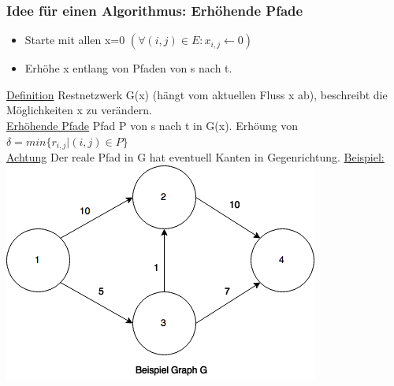 \documentclass[a4paper]{article}
\begin{document}
\subsubsection*{Idee für einen Algorithmus: Erhöhende Pfade}
\begin{itemize}
\item Starte mit allen x=0 $(\forall (i,j) \in E: x_{i,j} \leftarrow 0)$
\item Erhöhe x entlang von Pfaden von s nach t.
\end{itemize}
\underline{Definition} Restnetzwerk G(x) (hängt vom aktuellen Fluss x ab), beschreibt die Möglichkeiten x zu verändern.\\
\underline{Erhöhende Pfade} Pfad P von s nach t in G(x). Erhöung von $\delta = min \{ r_{i,j} | (i,j)\in P\}$\\
\underline{Achtung} Der reale Pfad in G hat eventuell Kanten in Gegenrichtung.
\underline{Beispiel:}\\
\includegraphics[scale=0.4]{AE10.png}
\end{document}
